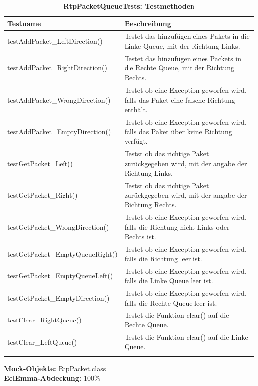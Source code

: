 \documentclass[a4,12pt]{scrartcl}
\begin{document}
\begin{longtable}{ p{7cm} p{7cm} }  
   {Testname} & {Beschreibung}\\ \midrule
    testAddPacket\_LeftDirection() & Testet das hinzufügen eines Pakets in die Linke Queue, mit der Richtung Links.\\ \addlinespace
    testAddPacket\_RightDirection() & Testet das hinzufügen eines Packets in die Rechte Queue, mit der Richtung Rechts. \\ \addlinespace
    testAddPacket\_WrongDirection() & Testet ob eine Exception geworfen wird, falls das Paket eine falsche Richtung enthält.\\ \addlinespace
    testAddPacket\_EmptyDirection() & Testet ob eine Exception geworfen wird, falls das Paket über keine Richtung verfügt. \\ \addlinespace
    testGetPacket\_Left() & Testst ob das richtige Paket zurückgegeben wird, mit der angabe der Richtung Links. \\ \addlinespace
    testGetPacket\_Right() & Testst ob das richtige Paket zurückgegeben wird, mit der angabe der Richtung Rechts. \\ \addlinespace
    testGetPacket\_WrongDirection() & Testet ob eine Exception geworfen wird, falls die Richtung nicht Links oder Rechts ist. \\ \addlinespace
    testGetPacket\_EmptyQueueRight() & Testet ob eine Exception geworfen wird, falls die Richtung leer ist. \\ \addlinespace
    testGetPacket\_EmptyQueueLeft() & Testet ob eine Exception geworfen wird, falls die Linke Queue leer ist. \\ \addlinespace
    testGetPacket\_EmptyDirection() & Testet ob eine Exception geworfen wird, falls die Rechte Queue leer ist.\\ \addlinespace
    testClear\_RightQueue() & Testet die Funktion clear() auf die Rechte Queue. \\ \addlinespace
    testClear\_LeftQueue() & Testet die Funktion clear() auf die Linke Queue.\\
\caption{\textbf{RtpPacketQueueTests: Testmethoden}}
\end{longtable}

\noindent \textbf{Mock-Objekte:} RtpPacket.class\\
\textbf{EclEmma-Abdeckung:} 100\%
\end{document}
